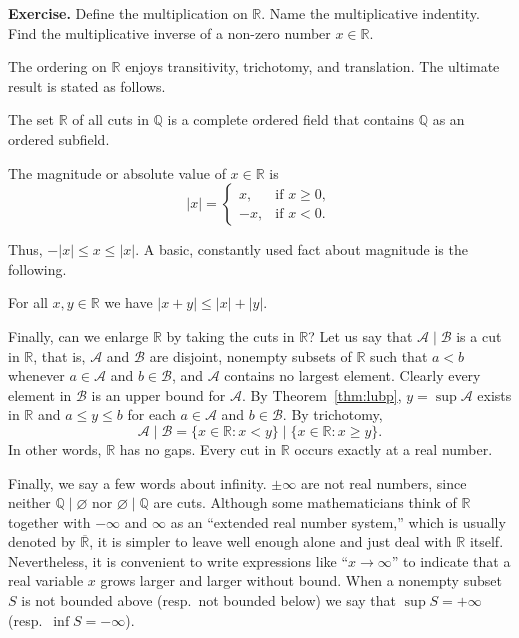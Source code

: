 \noindent\textbf{Exercise.} Define the multiplication on $\mathbb R$.  Name the multiplicative indentity.  Find the multiplicative inverse of a non-zero number $x \in \mathbb R$.

The ordering on $\mathbb R$ enjoys \textsf{transitivity}, \textsf{trichotomy}, and \textsf{translation}.
The ultimate result is stated as follows.
\begin{thm}
  The set $\mathbb R$ of all cuts in $\mathbb Q$ is a complete ordered field that contains $\mathbb Q$ as an ordered subfield.
\end{thm}

The \textsf{magnitude} or absolute value of $x \in \mathbb R$ is
\[
  |x| = \begin{cases}
    x, & \text{if $x \geqslant 0$}, \\
    -x, & \text{if $x < 0$}.
  \end{cases}
\]

Thus, $-|x| \leqslant x \leqslant |x|$.
A basic, constantly used fact about magnitude is the following.

\begin{thm}
  For all $x,y \in \mathbb R$ we have $|x+y| \leqslant |x| + |y|$.
\end{thm}

Finally, can we enlarge $\mathbb R$ by taking the cuts in $\mathbb R$?
Let us say that $\mathcal A \mid \mathcal B$ is a cut in $\mathbb R$, that is, $\mathcal A$ and $\mathcal B$ are disjoint, nonempty subsets of $\mathbb R$ such that $a < b$ whenever $a \in \mathcal A$ and $b \in \mathcal B$, and $\mathcal A$ contains no largest element.
Clearly every element in $\mathcal B$ is an upper bound for $\mathcal A$.
By Theorem~\ref{thm:lubp}, $y = \sup \mathcal A$ exists in $\mathbb R$ and $a \leqslant y \leqslant b$ for each $a \in \mathcal A$ and $b \in \mathcal B$.
By trichotomy,
\[
  \mathcal A \mid \mathcal B = \{ x \in \mathbb R \colon x < y \} \mid \{ x \in \mathbb R \colon x \geqslant y \}.
\]
In other words, $\mathbb R$ has no gaps.  Every cut in $\mathbb R$ occurs exactly at a real number.

Finally, we say a few words about infinity.
$\pm \infty$ are not real numbers, since neither $\mathbb Q \mid \varnothing$ nor $\varnothing \mid \mathbb Q$ are cuts.
Although some mathematicians think of $\mathbb R$ together with $-\infty$ and $\infty$ as an ``extended real number system,'' which is usually denoted by $\overline{\mathbb{R}}$, it is simpler to leave well enough alone and just deal with $\mathbb R$ itself.  Nevertheless, it is convenient to write expressions like ``$x \to \infty$'' to indicate that a real variable $x$ grows larger and larger without bound.
When a nonempty subset $S$ is not bounded above (resp.\ not bounded below) we say that $\sup S = +\infty$ (resp.\ $\inf S = -\infty$).

